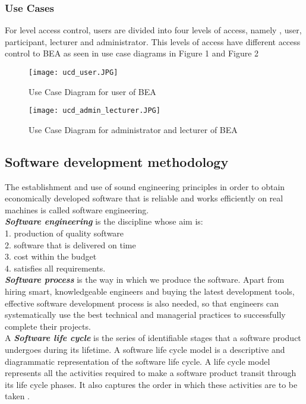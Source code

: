 \documentclass{scrartcl}
\begin{document}
  	
  	\subsubsection{Use Cases }
  	For level access control, users are divided into four levels of access, namely , user, participant, lecturer and administrator. This levels of access have different access control to BEA  as seen in use case diagrams in Figure 1  and Figure 2
  	\begin{figure}[H]
\centering
\texttt{[image: ucd\_user.JPG]}
\caption{Use Case Diagram for user of BEA}
\label{ucd_user}
\end{figure}

\begin{figure}[H]
\centering
\texttt{[image: ucd\_admin\_lecturer.JPG]}
\caption{Use Case Diagram for administrator and lecturer of BEA}
\label{ucd_user}
\end{figure}

  	\subsection{Software development methodology}
  	The establishment and use of sound engineering principles in order to obtain economically
developed software that is reliable and works efficiently on real machines is called software engineering.\\
\textbf{\textit{ Software engineering}} is the discipline whose aim is:\\
1. production of quality software\\
2. software that is delivered on time\\
3. cost within the budget\\
4. satisfies all requirements.\\
\textbf{\textit{ Software process}} is the way in which we produce the software. Apart from hiring smart,
knowledgeable engineers and buying the latest development tools, effective software
development process is also needed, so that engineers can systematically use the best technical
and managerial practices to successfully complete their projects.\\
A \textbf{\textit{ Software life cycle}} is the series of identifiable stages that a software product undergoes during
its lifetime. A software life cycle model is a descriptive and diagrammatic representation of the
software life cycle. A life cycle model represents all the activities required to make a software
product transit through its life cycle phases. It also captures the order in which these activities are
to be taken .\\
\end{document}
